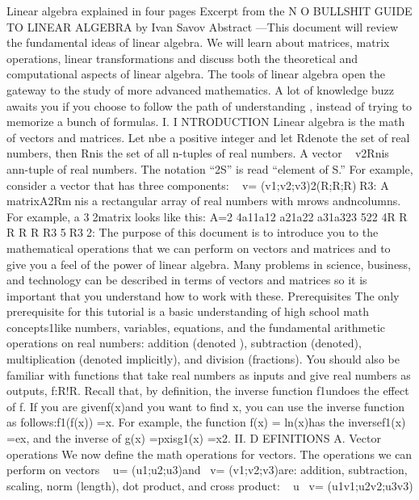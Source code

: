 Linear algebra explained in four pages
Excerpt from the N O BULLSHIT GUIDE TO LINEAR ALGEBRA by Ivan Savov
Abstract —This document will review the fundamental ideas of linear algebra.
We will learn about matrices, matrix operations, linear transformations and
discuss both the theoretical and computational aspects of linear algebra. The
tools of linear algebra open the gateway to the study of more advanced
mathematics. A lot of knowledge buzz awaits you if you choose to follow the
path of understanding , instead of trying to memorize a bunch of formulas.
I. I NTRODUCTION
Linear algebra is the math of vectors and matrices. Let nbe a positive
integer and let Rdenote the set of real numbers, then Rnis the set of all
n-tuples of real numbers. A vector ~ v2Rnis ann-tuple of real numbers.
The notation “2S” is read “element of S.” For example, consider a vector
that has three components:
~ v= \left(v1;v2;v3\right)2\left(R;R;R\right)R3:
A matrixA2Rmnis a rectangular array of real numbers with mrows
andncolumns. For example, a 32matrix looks like this:
A=2
4a11a12
a21a22
a31a323
522
4R R
R R
R R3
5R32:
The purpose of this document is to introduce you to the mathematical
operations that we can perform on vectors and matrices and to give you a
feel of the power of linear algebra. Many problems in science, business,
and technology can be described in terms of vectors and matrices so it is
important that you understand how to work with these.
Prerequisites
The only prerequisite for this tutorial is a basic understanding of high school
math concepts1like numbers, variables, equations, and the fundamental
arithmetic operations on real numbers: addition \left(denoted \+\right), subtraction
\left(denoted \right), multiplication \left(denoted implicitly\right), and division \left(fractions\right).
You should also be familiar with functions that take real numbers as
inputs and give real numbers as outputs, f:R!R. Recall that, by
deﬁnition, the inverse function f 1undoes the effect of f. If you are
givenf\left(x\right)and you want to ﬁnd x, you can use the inverse function as
follows:f 1\left(f\left(x\right)\right) =x. For example, the function f\left(x\right) = ln\left(x\right)has the
inversef 1\left(x\right) =ex, and the inverse of g\left(x\right) =pxisg 1\left(x\right) =x2.
II. D EFINITIONS
A. Vector operations
We now deﬁne the math operations for vectors. The operations we can
perform on vectors ~ u= \left(u1;u2;u3\right)and~ v= \left(v1;v2;v3\right)are: addition,
subtraction, scaling, norm \left(length\right), dot product, and cross product:
~ u\+~ v= \left(u1\+v1;u2\+v2;u3\+v3\right)
